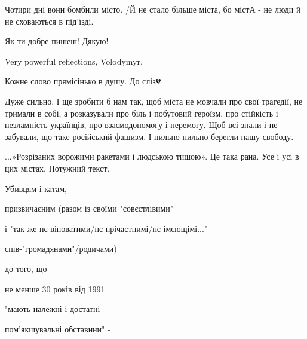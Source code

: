  
 
 
 
 

\qqSecCmt

\raggedcolumns
\begin{multicols}{2} %
\setlength{\parindent}{0pt}

\begin{itemize} %

Чотири дні вони бомбили місто. /Й не стало більше міста, бо містА - не люди й
не сховаються в під'їзді.


Як ти добре пишеш! Дякую!


Very powerful reflections, Volodymyr.


Кожне слово прямісінько в душу. До сліз💔🙏🏽


Дуже сильно. І ще зробити б нам так, щоб міста не мовчали про свої трагедії, не
тримали в собі, а розказували про біль і побутовий героїзм, про стійкість і
незламність українців, про взаємодопомогу і перемогу. Щоб всі знали і не
забували, що таке російський фашизм. І пильно-пильно берегли нашу свободу.


...»Розрізаних ворожими ракетами і людською тишою». Це така рана. Усе і усі в цих
містах. Потужний текст.


Убивцям і катам,

призвичаєним (разом із своїми "совєстлівими"

і "так же нє-віноватими/нє-прічастнимі/нє-імєющімі..."

спів-"громадянами"/родичами)

до того, що

не менше 30 років від 1991

"мають належні і достатні

пом'якшувальні обставини" -


\end{itemize}
\end{multicols}
